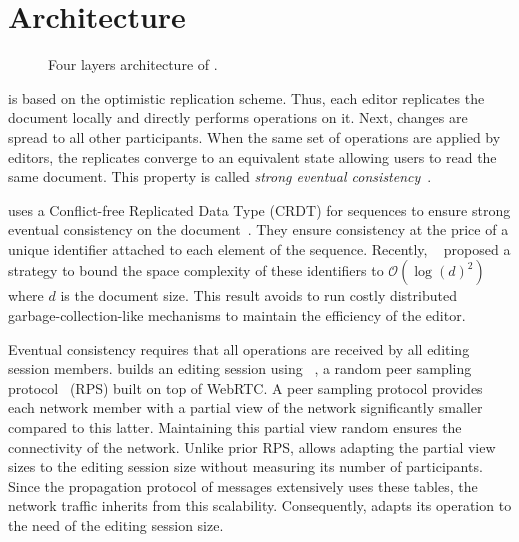 
\section{Architecture}
\label{sec:architecture}

\begin{figure}
  \centering
  
  \caption{\label{fig:architecture} Four layers architecture of \CRATE.}
\end{figure}

\CRATE is based on the optimistic replication scheme. Thus, each editor
replicates the document locally and directly performs operations on it. Next,
changes are spread to all other participants. When the same set of operations
are applied by editors, the replicates converge to an equivalent state allowing
users to read the same document.  This property is called \emph{strong eventual
  consistency}~\cite{bailis2013eventual}.

\CRATE uses a Conflict-free Replicated Data Type (CRDT) for sequences to ensure
strong eventual consistency on the
document~\cite{shapiro2011comprehensive}. They ensure consistency at the price
of a unique identifier attached to each element of the sequence. Recently,
\LSEQ~\cite{nedelec2013lseq} proposed a strategy to bound the space complexity
of these identifiers to $\mathcal{O}(\log(d)^2)$ where $d$ is the document
size. This result avoids to run costly distributed garbage-collection-like
mechanisms to maintain the efficiency of the editor.

Eventual consistency requires that all operations are received by all editing
session members.  \CRATE builds an editing session using
\SPRAY~\cite{nedelec2015spray}, a random peer sampling
protocol~\cite{jelasity2007gossip} (RPS) built on top of WebRTC. A peer sampling
protocol provides each network member with a partial view of the network
significantly smaller compared to this latter. Maintaining this partial view
random ensures the connectivity of the network. Unlike prior RPS, \SPRAY allows
adapting the partial view sizes to the editing session size without measuring
its number of participants. Since the propagation protocol of messages
extensively uses these tables, the network traffic inherits from this
scalability. Consequently, \CRATE adapts its operation to the need of the
editing session size.


